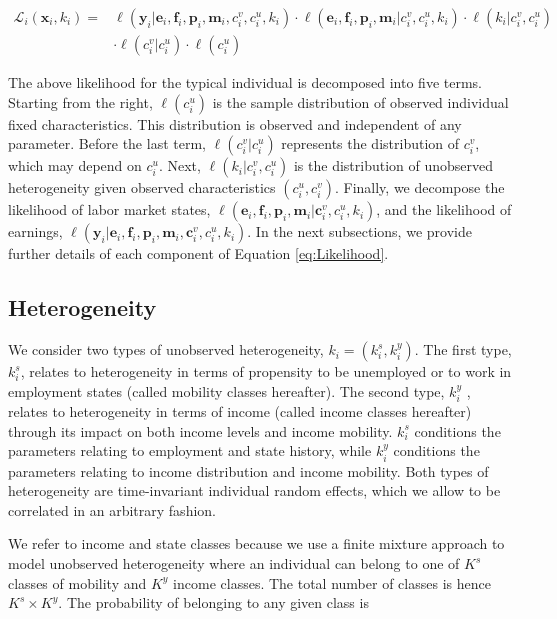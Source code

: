 \documentclass[12pt, a4paper]{article}
\begin{document}
\begin{align}\label{eq:Likelihood}
\mathcal{L}_{i}(\textbf{x}_i,k_i)=&\ell(\textbf{y}_i|\textbf{e}_i,\textbf{f}_i,\textbf{p}_i,\textbf{m}_i,c_i^v,c_i^u,k_i)\cdot \ell(\textbf{e}_i,\textbf{f}_i,\textbf{p}_i,\textbf{m}_i|c_i^v,c_i^u,k_i)\cdot \ell(k_i|c_i^v,c_i^u)\\ \nonumber
&\cdot \ell(c_i^v|c_i^u)\cdot \ell (c_i^u)
\end{align}

The above likelihood for the typical individual is decomposed into five terms. Starting from the right, $\ell (c_i^u)$ is the sample distribution of observed individual fixed characteristics. This distribution is observed and independent of any parameter. Before the last term, $\ell(c_i^v|c_i^u)$ represents the distribution of $c_i^v$, which may depend on $c_i^u$. Next, $\ell(k_i|c_i^v,c_i^u)$ is the distribution of unobserved heterogeneity given observed characteristics $(c_i^u,c_i^v)$. Finally, we decompose the likelihood of labor market states, $\ell(\textbf{e}_i,\textbf{f}_i,\textbf{p}_i,\textbf{m}_i|\textbf{c}_i^v,c_i^u,k_i)$, and the likelihood of earnings, $\ell(\textbf{y}_i|\textbf{e}_i,\textbf{f}_i,\textbf{p}_i,\textbf{m}_i,\textbf{c}_i^v,c_i^u,k_i)$. In the next subsections, we provide further details of each component of Equation \ref{eq:Likelihood}.

\subsection{Heterogeneity}

We consider two types of unobserved heterogeneity, $k_i = (k^s_i, k^y_i)$. The first type, $k^s_i$, relates to heterogeneity in terms of propensity to be unemployed or to work in employment states (called mobility classes hereafter). The second type, $k^y_i$ , relates to heterogeneity in terms of income (called income classes hereafter) through its impact on both income levels and income mobility. $k^s_i$ conditions the parameters relating to employment and state history, while $k^y_i$ conditions the parameters relating to income distribution and income mobility. Both types of heterogeneity are time-invariant individual random effects, which we allow to be correlated in an arbitrary fashion.

We refer to income and state classes because we use a finite mixture approach to
model unobserved heterogeneity where an individual can belong to one of $K^s$ classes of mobility and $K^y$ income classes. The total number of classes is hence $K^s \times K^y$. The probability of belonging to any given class is
\end{document}
